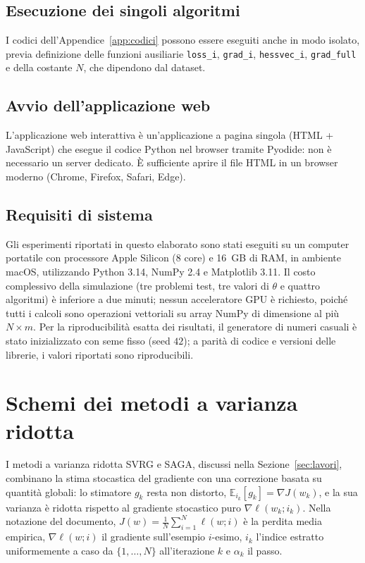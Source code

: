 \documentclass[a4paper,12pt]{article}
\numberwithin{equation}{section}
\numberwithin{figure}{section}
\numberwithin{table}{section}
\begin{document}
\subsection{Esecuzione dei singoli algoritmi}

I codici dell'Appendice~\ref{app:codici} possono essere eseguiti anche in
modo isolato, previa definizione delle funzioni ausiliarie
\texttt{loss\_i}, \texttt{grad\_i}, \texttt{hessvec\_i}, \texttt{grad\_full}
e della costante $N$, che dipendono dal dataset.

\subsection{Avvio dell'applicazione web}

L'applicazione web interattiva è un'applicazione a pagina singola (HTML +
JavaScript) che esegue il codice Python nel browser tramite Pyodide: non è
necessario un server dedicato. È sufficiente aprire il file HTML in un
browser moderno (Chrome, Firefox, Safari, Edge).

\subsection{Requisiti di sistema}

Gli esperimenti riportati in questo elaborato sono stati eseguiti su un
computer portatile con processore Apple Silicon (8 core) e 16~GB di RAM, in
ambiente macOS, utilizzando Python 3.14, NumPy 2.4 e Matplotlib 3.11. Il costo
complessivo della simulazione (tre problemi test, tre valori di $\theta$ e
quattro algoritmi) è inferiore a due minuti; nessun acceleratore GPU è
richiesto, poiché tutti i calcoli sono operazioni vettoriali su array NumPy di
dimensione al più $N \times m$. Per la riproducibilità esatta dei risultati,
il generatore di numeri casuali è stato inizializzato con seme fisso (seed
$42$); a parità di codice e versioni delle librerie, i valori riportati sono
riproducibili.

\section{Schemi dei metodi a varianza ridotta}\label{app:schemi}

I metodi a varianza ridotta SVRG e SAGA, discussi nella
Sezione~\ref{sec:lavori}, combinano la stima stocastica del gradiente con una
correzione basata su quantità globali: lo stimatore $g_k$ resta non distorto,
$\mathbb{E}_{i_k}[g_k] = \nabla J(w_k)$, e la sua varianza è ridotta rispetto
al gradiente stocastico puro $\nabla\ell(w_k; i_k)$. Nella notazione del
documento, $J(w) = \frac{1}{N}\sum_{i=1}^N \ell(w; i)$ è la perdita media
empirica, $\nabla\ell(w; i)$ il gradiente sull'esempio $i$-esimo, $i_k$
l'indice estratto uniformemente a caso da $\{1,\dots,N\}$ all'iterazione $k$ e
$\alpha_k$ il passo.
\end{document}
